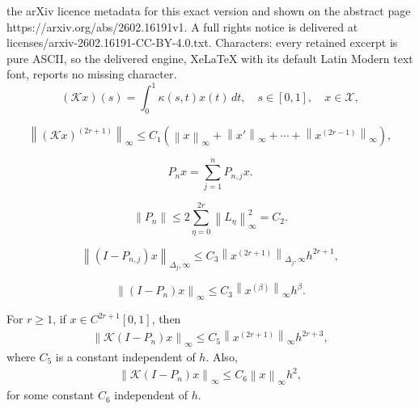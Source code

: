 \documentclass[10pt,a4paper]{amsart}
\newcommand{\norm}[1]{\left\lVert #1\right\rVert}
\begin{document}
the arXiv licence metadata for this exact version and shown on the abstract page https://arxiv.org/abs/2602.16191v1. A full rights notice is delivered at licenses/arxiv-2602.16191-CC-BY-4.0.txt. Characters: every retained excerpt is pure ASCII, so the delivered engine, XeLaTeX with its default Latin Modern text font, reports no missing character.
\begin{equation} \label{Eq: 002}
	(\mathcal{K}x)(s) = \int_{0}^{1} \kappa(s, t)x(t) \, dt, \quad s \in [0, 1], \quad x \in \mathcal{X},
\end{equation}

\begin{equation} \label{Eq: 005}
	\norm{(\mathcal{K}x)^{(2r+1)}}_\infty \leq C_1 \left( \norm{x}_\infty + \norm{x'}_\infty + \cdots + \norm{x^{(2r-1)}}_\infty \right),
\end{equation}

\begin{equation} \label{Eq: 007}
	P_n x = \sum_{j=1}^{n} P_{n,j} x.
\end{equation}

\begin{equation} \label{Eq: 008}
	\norm{P_n} \leq 2 \sum_{\eta=0}^{2r} \norm{L_{\eta}}_{\infty}^2 =C_2. 
\end{equation}

\begin{equation} \label{Eq: 009}
	\norm{(I - P_{n,j}) x}_{\Delta_j, \infty} \leq C_3 \norm{x^{(2r+1)}}_{\Delta_j, \infty} h^{2r+1},
\end{equation}

\begin{equation} \label{Eq: 0010}
	\norm{(I - P_{n})x}_\infty \leq C_3 \norm{x^{(\beta)}}_\infty h^{\beta}.
\end{equation}

\begin{proposition} \label{pro1}
	For $r \geq 1$, if $x \in C^{2r+1}[0,1]$, then
	\begin{eqnarray*}
		\norm{\mathcal{K}(I-P_n)x }_\infty \leq C_5 \norm{x^{(2r+1)}}_{ \infty} h^{2r + 3},
	\end{eqnarray*}
	where $C_5$ is a constant independent of $h$. Also,
	\begin{eqnarray*} 
		\norm{\mathcal{K}(I-P_n)x }_\infty \leq C_6 \norm{x}_\infty h^2,
	\end{eqnarray*}
	for some constant $C_6$ independent of $h$.
\end{proposition}
\end{document}
